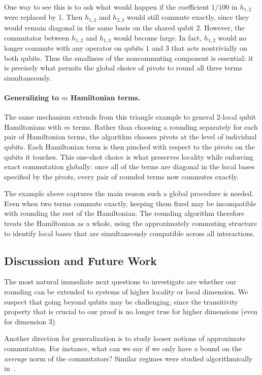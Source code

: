 \documentclass[11pt]{article}
\theoremstyle{plain}
\begin{document}
One way to see this is to ask what would happen if the coefficient
$1/100$ in $h_{1,2}$ were replaced by $1$.  Then $h_{1,2}$ and $h_{2,3}$
would still commute exactly, since they would remain diagonal in the same
basis on the shared qubit $2$.  However, the commutator between $h_{1,2}$
and $h_{1,3}$ would become large.  In fact, $h_{1,2}$ would no longer
commute with any operator on qubits $1$ and $3$ that acts nontrivially on
both qubits.  Thus the smallness of the noncommuting component is
essential: it is precisely what permits the global choice of pivots to
round all three terms simultaneously.

\paragraph{Generalizing to $m$ Hamiltonian terms.}

The same mechanism extends from this triangle example to general
$2$-local qubit Hamiltonians with $m$ terms.  Rather than choosing a
rounding separately for each pair of Hamiltonian terms, the algorithm
chooses pivots at the level of individual qubits.  Each Hamiltonian term
is then pinched with respect to the pivots on the qubits it touches.  This
one-shot choice is what preserves locality while enforcing exact
commutation globally: once all of the terms are diagonal in the local bases
specified by the pivots, every pair of rounded terms now commutes exactly.

The example above captures the main reason such a global procedure is
needed.  Even when two terms commute exactly, keeping them fixed may be
incompatible with rounding the rest of the Hamiltonian.  The rounding
algorithm therefore treats the Hamiltonian as a whole, using the
approximately commuting structure to identify local bases that are
simultaneously compatible across all interactions.

\subsection{Discussion and Future Work}
The most natural immediate next questions to investigate are whether our rounding can be extended to systems of higher locality or local dimension. We suspect that going beyond qubits may be challenging, since the transitivity property that is crucial to our proof is no longer true for higher dimensions (even for dimension 3). 

Another direction for generalization is to study looser notions of approximate commutation. For instance, what can we say if we only have a bound on the \emph{average} norm of the commutators? Similar regimes were studied algorithmically in~\cite{schmidhuber2025hamiltoniandecodedquantuminterferometry}. 
\end{document}
